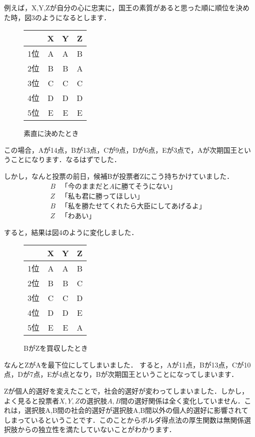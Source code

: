 例えば，X,Y,Zが自分の心に忠実に，国王の素質があると思った順に順位を決めた時，図3のようになるとします．

\begin{figure}[!h]
\centering
\begin{tabular}{|c|c|c|c|} \hline
    & X & Y & Z \\ \hline
    1位 & A & A & B \\ \hline
    2位 & B & B & A \\ \hline
    3位 & C & C & C \\ \hline
    4位 & D & D & D \\ \hline
    5位 & E & E & E \\ \hline
\end{tabular}
\caption{素直に決めたとき}
\end{figure}

この場合，Aが14点，Bが13点，Cが9点，Dが6点，Eが3点で，Aが次期国王ということになります．なるはずでした．

しかし，なんと投票の前日，候補Bが投票者Zにこう持ちかけていました．
\begin{align*}
    B　 & 「今のままだとAに勝てそうにない」\\
    Z　 & 「私も君に勝ってほしい」\\
    B　 & 「私を勝たせてくれたら大臣にしてあげるよ」\\
    Z　 & 「わあい」
\end{align*}

すると，結果は図4のように変化しました．

\begin{figure}[!h]
\centering
\begin{tabular}{|c|c|c|c|} \hline
    & X & Y & Z \\ \hline
    1位 & A & A & B \\ \hline
    2位 & B & B & C \\ \hline
    3位 & C & C & D \\ \hline
    4位 & D & D & E \\ \hline
    5位 & E & E & A \\ \hline
\end{tabular}
\caption{BがZを買収したとき}
\end{figure}
なんとZがAを最下位にしてしまいました．
すると，Aが11点，Bが13点，Cが10点，Dが7点，Eが4点となり，Bが次期国王ということになってしまいます．

Zが個人的選好を変えたことで，社会的選好が変わってしまいました．しかし，よく見ると投票者$X,Y,Z$の選択肢$A,B$間の選好関係は全く変化していません．これは，選択肢A,B間の社会的選好が選択肢A,B間以外の個人的選好に影響されてしまっているということです．このことからボルダ得点法の厚生関数は無関係選択肢からの独立性を満たしていないことがわかります．

